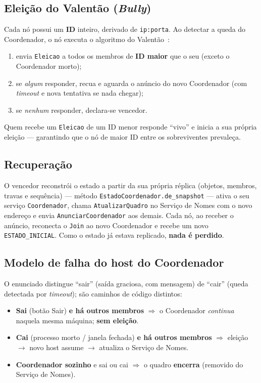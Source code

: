 \subsection{Eleição do Valentão (\emph{Bully})}

Cada nó possui um \textbf{ID} inteiro, derivado de \texttt{ip:porta}. Ao detectar a queda
do Coordenador, o nó executa o algoritmo do Valentão~\citep{bully}:

\begin{enumerate}
  \item envia \texttt{Eleicao} a todos os membros de \textbf{ID maior} que o seu (exceto o
        Coordenador morto);
  \item se \emph{algum} responder, recua e aguarda o anúncio do novo Coordenador (com
        \emph{timeout} e nova tentativa se nada chegar);
  \item se \emph{nenhum} responder, declara-se vencedor.
\end{enumerate}

Quem recebe um \texttt{Eleicao} de um ID menor responde ``vivo'' e inicia a sua própria
eleição --- garantindo que o nó de maior ID entre os sobreviventes prevaleça.

\subsection{Recuperação}

O vencedor reconstrói o estado a partir da sua própria réplica (objetos, membros, travas e
sequência) --- método \texttt{EstadoCoordenador.de\_snapshot} --- ativa o seu serviço
\texttt{Coordenador}, chama \texttt{AtualizarQuadro} no Serviço de Nomes com o novo endereço
e envia \texttt{AnunciarCoordenador} aos demais. Cada nó, ao receber o anúncio, reconecta o
\texttt{Join} ao novo Coordenador e recebe um novo \texttt{ESTADO\_INICIAL}. Como o estado
já estava replicado, \textbf{nada é perdido}.

\subsection{Modelo de falha do host do Coordenador}

O enunciado distingue ``sair'' (saída graciosa, com mensagem) de ``cair'' (queda detectada
por \emph{timeout}); são caminhos de código distintos:

\begin{itemize}
  \item \textbf{Sai} (botão Sair) \textbf{e há outros membros} $\Rightarrow$ o Coordenador
        \emph{continua} naquela mesma máquina; \textbf{sem eleição}.
  \item \textbf{Cai} (processo morto / janela fechada) \textbf{e há outros membros}
        $\Rightarrow$ eleição $\rightarrow$ novo host assume $\rightarrow$ atualiza o
        Serviço de Nomes.
  \item \textbf{Coordenador sozinho} e sai ou cai $\Rightarrow$ o quadro \textbf{encerra}
        (removido do Serviço de Nomes).
\end{itemize}

